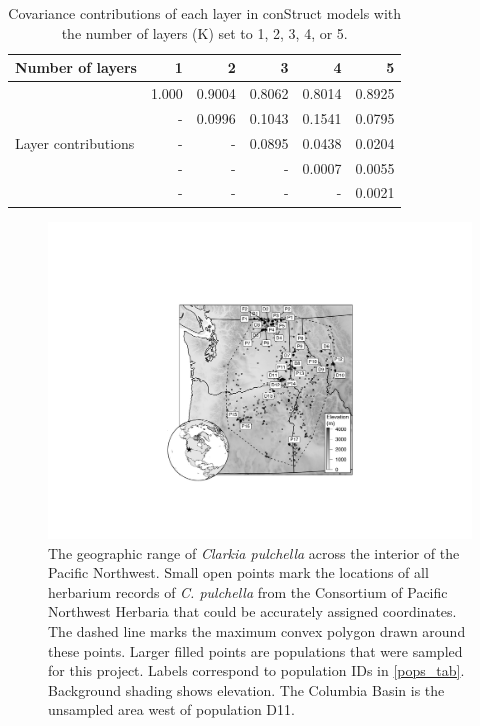 \documentclass{article}
\begin{document}
\begin{table}[ht]
\centering
\caption[Covariance contributions of each layer in conStruct models]{Covariance contributions of each layer in conStruct models with the number of layers (K) set to 1, 2, 3, 4, or 5.}
\label{layer_contributions}
\begin{tabular}{lrrrrr}
\toprule
Number of layers & 1 & 2 & 3 & 4 & 5 \\
\midrule
\multirow{5}{*}{Layer contributions} & 1.000	& 0.9004	 &	0.8062    &	0.8014	&	0.8925 \\
& -	  &	0.0996   &	0.1043	  &	0.1541	&	0.0795 \\
& -	  &	-	     &	0.0895	  &	0.0438	&	0.0204 \\
& -	  &	-	     &	-	      &	0.0007  &	0.0055 \\
& -	  &	-	     &	-	      &	-	    &	0.0021 \\
\bottomrule
\end{tabular}
\end{table}

\clearpage

\begin{figure}[ht]
\centering
\includegraphics[width=14cm]{figs/map_elev.pdf}
\caption[The geographic range of \textit{Clarkia pulchella} and sampling locations]{The geographic range of \textit{Clarkia pulchella} across the interior of the Pacific Northwest. Small open points mark the locations of all herbarium records of \textit{C. pulchella} from the Consortium of Pacific Northwest Herbaria that could be accurately assigned coordinates. The dashed line marks the maximum convex polygon drawn around these points. Larger filled points are populations that were sampled for this project. Labels correspond to population IDs in \autoref{pops_tab}. Background shading shows elevation. The Columbia Basin is the unsampled area west of population D11.}
\label{map_fig_popgen}
\end{figure}
\end{document}
